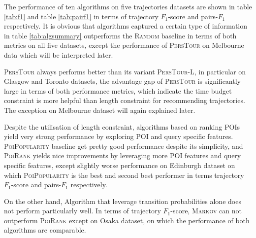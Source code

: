 The performance of ten algorithms on five trajectories datasets are shown in table \ref{tab:f1}
and table \ref{tab:pairf1} in terms of trajectory $F_1$-score and pairs-$F_1$ respectively.
%
It is obvious that algorithms captured a certain type of information in table \ref{tab:algsummary}
outperforms the \textsc{Random} baseline in terms of both metrics on all five datasets,
except the performance of \textsc{PersTour}\cite{ijcai15} on Melbourne data which will be interpreted later.

\textsc{PersTour}\cite{ijcai15} always performs better than its variant \textsc{PersTour-L},
in particular on Glasgow and Toronto datasets, the advantage gap of \textsc{PersTour}
is significantly large in terms of both performance metrics,
%
which indicate the time budget constraint is more helpful than length constraint for recommending trajectories.
The exception on Melbourne dataset will again explained later.

Despite the utilisation of length constraint, algorithms based on ranking POIs yield very strong performance
by exploring POI and query specific features.
%
\textsc{PoiPopularity} baseline get pretty good performance despite its simplicity,
and \textsc{PoiRank} yields nice improvements by leveraging more POI features and query specific features,
except slightly worse performance on Edinburgh dataset on which \textsc{PoiPopularity} is the best and
second best performer in terms trajectory $F_1$-score and pairs-$F_1$ respectively.

On the other hand, Algorithm that leverage transition probabilities alone does not perform particularly well.
%
In terms of trajectory $F_1$-score,
\textsc{Markov} can not outperform \textsc{PoiRank} except on Osaka dataset,
on which the performance of both algorithms are comparable.

